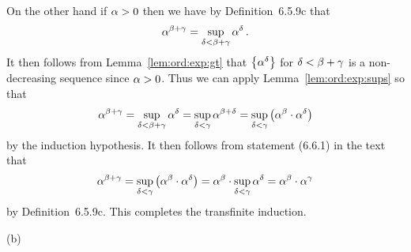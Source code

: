{{    On the other hand if $\alpha > 0$ then we have by Definition~6.5.9c that
    $$
    \alpha^{\beta+\gamma} = \sup_{\delta < \beta+\gamma} \alpha^\delta \,.
    $$
    It then follows from Lemma~\ref{lem:ord:exp:gt} that $\left\{ \alpha^\delta \right\}$ for $\delta < \beta + \gamma$ is a non-decreasing sequence since $\alpha > 0$.
    Thus we can apply Lemma~\ref{lem:ord:exp:sups} so that
    $$
    \alpha^{\beta+\gamma} = \sup_{\delta < \beta+\gamma} \alpha^\delta = \sup_{\delta < \gamma} \alpha^{\beta + \delta} = \sup_{\delta < \gamma} \left( \alpha^\beta \cdot \alpha^\delta \right)
    $$
    by the induction hypothesis.
    It then follows from statement (6.6.1) in the text that
    $$
    \alpha^{\beta+\gamma} = \sup_{\delta < \gamma} \left( \alpha^\beta \cdot \alpha^\delta \right) = \alpha^\beta \cdot \sup_{\delta < \gamma} \alpha^\delta = \alpha^\beta \cdot \alpha^\gamma
    $$
    by Definition~6.5.9c.
    This completes the transfinite induction.
  }

  (b)
  }
